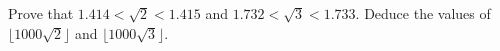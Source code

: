Prove that $1.414<\sqrt2<1.415$ and $1.732<\sqrt3<1.733$. Deduce the values of $\lfloor1000\sqrt2\rfloor$ and $\lfloor1000\sqrt3\rfloor$.
